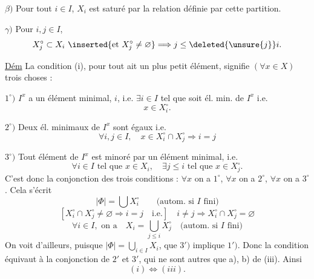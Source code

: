 
$\beta)$ Pour tout $i\in I$, $X_i$ est saturé par la relation   définie par cette partition.

$\gamma)$ Pour $i,j\in I$, 
\[
X_j^{\circ}\subset X_i\ \inserted{\text{et }X_j^{\circ}\ne\varnothing}\Longrightarrow j\leq\deleted{\unsure{j}}i.
\]

\uline{Dém} La condition (i),  pour tout   ait un plus petit élément, signifie  $(\forall x\in X)$ trois choses :

$1^{\circ})$ $I^x$  a un élément minimal, $i$, i.e. $\exists i\in I$ tel que  soit él. min. de $I^x$ i.e.
\[
x\in X_i^{\circ}.
\]

$2^{\circ})$ Deux él. minimaux de $I^x$ sont égaux i.e.
\[
\forall i,j\in I,\quad x\in X_i^{\circ}\cap X_j^{\circ}\Longrightarrow i=j
\]

$3^{\circ})$ Tout élément de $I^x$ est minoré par un élément minimal,  i.e.
\[
\forall i\in I\text{ tel que }x\in X_i,\quad \exists j\leq i\text{ tel que }x\in X_j^{\circ}.
\]
C'est donc la conjonction des trois conditions : $\forall x$ on a $1^{\circ}$, $\forall x$ on a $2^{\circ}$, $\forall x$ on a $3^{\circ}$. Cela s'écrit
\[
|\Phi|=\bigcup X_i^{\circ}\qquad\text{(autom. si }I\text{ fini)}\tag*{$1'$)}
\]
\[
[X_i^{\circ}\cap X_j^{\circ}\ne\varnothing\Rightarrow i=j\quad\text{i.e.}]\quad i\ne j\Longrightarrow X_i^{\circ}\cap X_j^{\circ}=\varnothing\tag*{$2'$)}
\]
\[
\forall i\in I,\text{ on a}\quad X_i=\bigcup_{j\leq i}X_j^{\circ}\quad\text{(autom. si }I\text{ fini)}\tag*{$3'$)}
\]
On voit d'ailleurs, puisque $|\Phi|=\bigcup_{i\in I}X_i$, que $3')$ implique $1')$. Donc la condition  équivaut à la conjonction de $2'$ et $3'$, qui ne sont autres que a), b) de (iii). Ainsi
\[
(i)\Longleftrightarrow(iii).
\]


